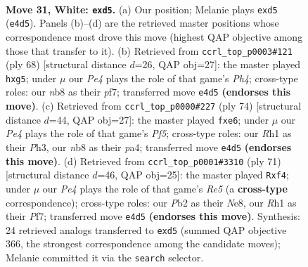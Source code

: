 \documentclass[11pt]{article}
\begin{document}
\clearpage

\begin{figure}[p]\centering
\begin{subfigure}{0.46\textwidth}\centering
\resizebox{\linewidth}{!}{%
\newchessgame
\chessboard[
  setfen={1n5r/5k2/1p1p4/pPpq4/4P3/7P/1P4P1/2K4R w - - 0 31},
  showmover=false,
  pgfstyle=straightmove, color=movearrow, markmove={e4-d5}
]}
\caption{}
\end{subfigure}\hfill
\begin{subfigure}{0.46\textwidth}\centering
\resizebox{\linewidth}{!}{%
\newchessgame
\chessboard[
  setfen={3k4/pp3p2/6p1/3PP1q1/7P/2P5/P4r2/K3R3 w - - 0 35},
  showmover=false,
  pgfstyle=straightmove, color=movearrow, markmove={h4-g5}
]}
\caption{}
\end{subfigure}
\\[4pt]
\begin{subfigure}{0.46\textwidth}\centering
\resizebox{\linewidth}{!}{%
\newchessgame
\chessboard[
  setfen={6k1/6p1/4q2p/1pR2P2/p2r4/P2P3P/1P6/7K w - - 0 38},
  showmover=false,
  pgfstyle=straightmove, color=movearrow, markmove={f5-e6}
]}
\caption{}
\end{subfigure}\hfill
\begin{subfigure}{0.46\textwidth}\centering
\resizebox{\linewidth}{!}{%
\newchessgame
\chessboard[
  setfen={2R1n1k1/1p3pp1/p7/6P1/4rQ2/1P6/P4P1K/8 b - - 0 36},
  showmover=false,
  pgfstyle=straightmove, color=movearrow, markmove={e4-f4}
]}
\caption{}
\end{subfigure}
\caption{\textbf{Move 31, White: \texttt{exd5}.} (a) Our position; Melanie plays \texttt{exd5} (\texttt{e4d5}). Panels (b)--(d) are the retrieved master positions whose correspondence most drove this move (highest QAP objective among those that transfer to it). (b) Retrieved from \texttt{ccrl\_top\_p0003\#121} (ply 68) [structural distance $d$=26, QAP obj=27]: the master played \texttt{hxg5}; under $\mu$ our \emph{Pe4} plays the role of that game's \emph{Ph4}; cross-type roles: our \emph{n}b8 as their \emph{p}f7; transferred move \texttt{e4d5} \textbf{(endorses this move)}. (c) Retrieved from \texttt{ccrl\_top\_p0000\#227} (ply 74) [structural distance $d$=44, QAP obj=27]: the master played \texttt{fxe6}; under $\mu$ our \emph{Pe4} plays the role of that game's \emph{Pf5}; cross-type roles: our \emph{R}h1 as their \emph{P}h3, our \emph{n}b8 as their \emph{p}a4; transferred move \texttt{e4d5} \textbf{(endorses this move)}. (d) Retrieved from \texttt{ccrl\_top\_p0001\#3310} (ply 71) [structural distance $d$=46, QAP obj=25]: the master played \texttt{Rxf4}; under $\mu$ our \emph{Pe4} plays the role of that game's \emph{Re5} (a \textbf{cross-type} correspondence); cross-type roles: our \emph{P}b2 as their \emph{N}e8, our \emph{R}h1 as their \emph{P}f7; transferred move \texttt{e4d5} \textbf{(endorses this move)}. Synthesis: 24 retrieved analogs transferred to \texttt{exd5} (summed QAP objective 366, the strongest correspondence among the candidate moves); Melanie committed it via the \texttt{search} selector.}
\label{fig:thought-m60}
\end{figure}
\end{document}
